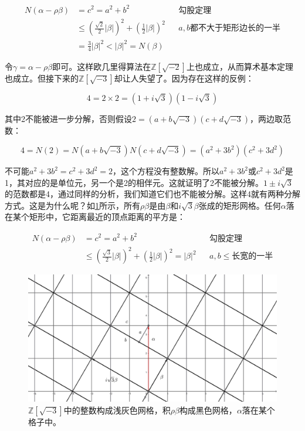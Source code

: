 \documentclass[b5paper]{ctexart}
\begin{document}
\begin{align*}
N(\alpha - \rho\beta) & = c^2 = a^2 + b^2  && \text{勾股定理} \\
  &\leq (\frac{\sqrt{2}}{2}|\beta|)^2 + (\frac{1}{2}|\beta|)^2 && a, b\text{都不大于矩形边长的一半} \\
  &= \frac{3}{4}|\beta|^2 < |\beta|^2 = N(\beta)
\end{align*}

令$\gamma = \alpha - \rho \beta$即可。这样欧几里得算法在$\mathbb{Z}[\sqrt{-2}]$上也成立，从而算术基本定理也成立。但接下来的$\mathbb{Z}[\sqrt{-3}]$却让人失望了。因为存在这样的反例：

\[
4 = 2 \times 2 = (1 + i\sqrt{3})(1 - i\sqrt{3})
\]

其中2不能被进一步分解，否则假设$2 = (a + b\sqrt{-3})(c + d\sqrt{-3})$，两边取范数：

\[
4 = N(2) = N(a+b\sqrt{-3})N(c + d\sqrt{-3}) = (a^2 + 3b^2)(c^2 + 3d^2)
\]

不可能$a^2 + 3b^2 = c^2 + 3d^2 = 2$，这个方程没有整数解。所以$a^2 + 3b^2$或$c^2 + 3d^2$是1，其对应的是单位元，另一个是2的相伴元。这就证明了2不能被分解。$1 \pm i\sqrt{3}$的范数都是4，通过同样的分析，我们知道它们也不能被分解。这样4就有两种分解方式。这是为什么呢？如\ref{fig:Z-sqrt-3}所示，所有$\rho \beta$是由$\beta$和$i\sqrt{3}\beta$张成的矩形网格。任何$\alpha$落在某个矩形中，它距离最近的顶点距离的平方是：

\begin{align*}
N(\alpha - \rho \beta) &= c^2 = a^2 + b^2  && \text{勾股定理} \\
  &\leq (\frac{\sqrt{3}}{2}|\beta|)^2 + (\frac{1}{2}|\beta|)^2 = |\beta|^2 && a, b \leq \text{长宽的一半}
\end{align*}

\begin{figure}[htbp]
 \centering
 \includegraphics[scale=0.3]{img/z-sqrt-3}
 \caption{$\mathbb{Z}[\sqrt{-3}]$中的整数构成浅灰色网格，积$\rho \beta$构成黑色网格，$\alpha$落在某个格子中。}
 \label{fig:Z-sqrt-3}
\end{figure}
\end{document}
